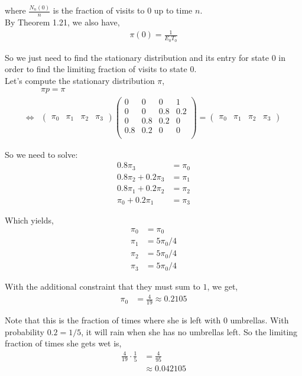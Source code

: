 \documentclass[12pt]{article}
\begin{document}
\begin{enumerate}[label=(\alph*)]
where $\frac{N_n(0)}{n}$ is the fraction of visits to $0$ up to time $n$.\\

By Theorem 1.21, we also have,
\begin{align*}
\pi(0) = \frac{1}{E_0T_0}
\end{align*}

So we just need to find the stationary distribution and its entry for state $0$ in order to find the limiting fraction of visits to state $0$.\\

Let's compute the stationary distribution $\pi$,
\begin{align*}
&\pi p = \pi\\
\iff &\begin{pmatrix}
\pi_0 & \pi_1 & \pi_2 & \pi_3
\end{pmatrix} \begin{pmatrix}
    0 & 0 & 0 & 1\\
    0 & 0 & 0.8 & 0.2\\
    0 & 0.8 & 0.2 & 0\\
    0.8 & 0.2 & 0 & 0\\
\end{pmatrix}
  = \begin{pmatrix}
\pi_0 & \pi_1 & \pi_2 & \pi_3
\end{pmatrix}
\end{align*}

So we need to solve:
\begin{align*}
0.8\pi_3 &= \pi_0\\
0.8\pi_2 + 0.2\pi_3 &= \pi_1\\
0.8\pi_1 + 0.2\pi_2 &= \pi_2\\
\pi_0 + 0.2\pi_1 &= \pi_3
\end{align*}

Which yields,
\begin{align*}
\pi_0 &= \pi_0\\
\pi_1 &= 5\pi_0/4\\
\pi_2 &= 5\pi_0/4\\
\pi_3 &= 5\pi_0/4
\end{align*}

With the additional constraint that they must sum to $1$, we get,
\begin{align*}
\pi_0 &= \frac{4}{19} \approx 0.2105
\end{align*}

Note that this is the fraction of times where she is left with $0$ umbrellas. With probability $0.2 = 1/5$, it will rain when she has no umbrellas left. So the limiting fraction of times she gets wet is,
\begin{align*}
\frac{4}{19} \cdot \frac{1}{5} &= \frac{4}{95}\\
&\approx 0.042105
\end{align*}
\end{enumerate}
\end{document}

